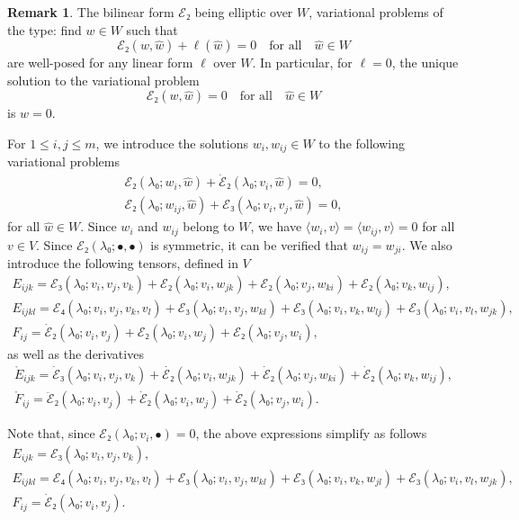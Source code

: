 \documentclass[12pt, final]{scrartcl}
\theoremstyle{definition}
\newtheorem{remark}{Remark}
\begin{document}
\begin{remark}
  \label{rem:20220902095055}
  The bilinear form \(ℰ₂\) being elliptic over \(W\), variational problems of the
  type: find \(w ∈ W\) such that
  \begin{equation}
    ℰ₂(w, \hat{w})+\ell(\hat{w}) = 0 \quad \text{for all} \quad \hat{w}∈W
  \end{equation}
  are well-posed for any linear form \(\ell\) over \(W\). In particular, for
  \(\ell=0\), the unique solution to the variational problem
  \begin{equation}
    ℰ₂(w, \hat{w}) = 0 \quad \text{for all} \quad \hat{w}∈W
  \end{equation}
  is \(w = 0\).
\end{remark}

For \(1 ≤ i, j ≤ m\), we introduce the solutions \(w_i, w_{ij} ∈ W\) to the
following variational problems
\begin{gather}
  \label{eq:20220524134525}
  ℰ₂(λ₀; w_i, \hat{w}) + \dot{ℰ}₂(λ₀; v_i, \hat{w}) = 0,\\
  \label{eq:20220519164523}
  ℰ₂(λ₀; w_{i j}, \hat{w})+ℰ₃(λ₀; v_i, v_j, \hat{w}) = 0,
\end{gather}
for all \(\hat{w} ∈ W\). Since \(w_{i}\) and \(w_{ij}\) belong to \(W\), we have
\(〈 w_{i}, v 〉 = 〈 w_{ij}, v 〉 = 0\) for all \(v ∈ V\). Since \(ℰ₂(λ₀; •,
•)\) is symmetric, it can be verified that \(w_{ij}=w_{ji}\). We also introduce
the following tensors, defined in \(V\)
\begin{gather}
  E_{ijk} = ℰ₃(λ₀; v_i, v_j, v_k) + ℰ₂(λ₀; v_i, w_{jk}) + ℰ₂(λ₀; v_j, w_{ki}) + ℰ₂(λ₀; v_k, w_{ij}),\\
  E_{ijkl} = ℰ₄(λ₀ ; v_i, v_j, v_k, v_l) + ℰ₃(λ₀ ; v_i, v_j, w_{kl}) + ℰ₃(λ₀ ; v_i, v_k, w_{lj}) + ℰ₃(λ₀ ; v_i, v_l, w_{jk}),\\
  F_{ij} = \dot{ℰ}₂(λ₀; v_i, v_j) + ℰ₂(λ₀; v_i, w_j) + ℰ₂(λ₀; v_j, w_i),
\end{gather}
as well as the derivatives
\begin{gather}
  \label{eq:20220615063626}
  \mathring{E}_{ijk} = \dot{ℰ}₃(λ₀; v_i, v_j, v_k) + \dot{ℰ₂}(λ₀; v_i, w_{jk}) + \dot{ℰ}₂(λ₀; v_j, w_{ki}) + \dot{ℰ}₂(λ₀; v_k, w_{ij}),\\
  \label{eq:20220615063633}
  \mathring{F}_{ij} = \ddot{ℰ}₂(λ₀; v_i, v_j) + \dot{ℰ}₂(λ₀; v_i, w_j) + \dot{ℰ}₂(λ₀; v_j, w_i).
\end{gather}

Note that, since \(ℰ₂(λ₀; v_i, •) = 0\), the above expressions simplify as follows
\begin{gather}
  \label{eq:20220524135619}
  E_{ijk} = ℰ₃(λ₀; v_i, v_j, v_k),\\
  \label{eq:20220524135553}
  E_{ijkl} = ℰ₄(λ₀ ; v_i, v_j, v_k, v_l) + ℰ₃(λ₀ ; v_i, v_j, w_{kl}) + ℰ₃(λ₀ ; v_i, v_k, w_{jl}) + ℰ₃(λ₀ ; v_i, v_l, w_{jk}),\\
  \label{eq:20220524135643}
  F_{ij} = \dot{ℰ}₂(λ₀; v_i, v_j).
\end{gather}
\end{document}
